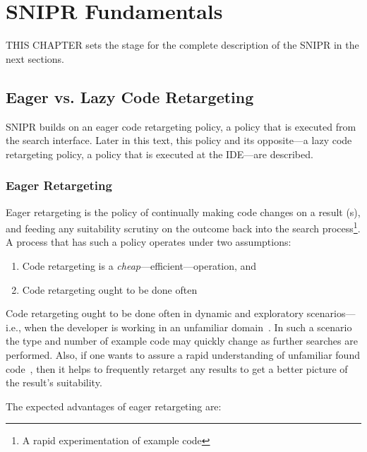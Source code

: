 \chapter{\uppercase{SnipR} Fundamentals}{}
\label{sec:fundamentals}


\lettrine[lraise=0.1, nindent=0em, slope=-.5em]{T} {HIS CHAPTER} sets the stage for the complete description of the \uppercase{SnipR} in the next sections.

\section{Eager vs. Lazy Code Retargeting}
\label{sec:eagervslazy}

\uppercase{SnipR} builds on an eager code retargeting policy, a policy that is executed from the search interface. Later in this text, this policy and its opposite---a lazy code retargeting policy, a policy that is executed at the IDE---are described.

\subsection{Eager Retargeting}

Eager retargeting is the policy of continually making code changes on a result (s), and feeding any suitability scrutiny on the outcome back into the search process\footnote{A rapid experimentation of example code}. A process that has such a policy operates under two assumptions:

\begin{enumerate}
	\item Code retargeting is a \emph{cheap}---efficient---operation, and
	\item Code retargeting ought to be done often
\end{enumerate}

Code retargeting ought to be done often in dynamic and exploratory scenarios---i.e., when the developer is working in an unfamiliar domain~\cite{Brandt:2009ew}. In such a scenario the type and number of example code may quickly change as further searches are performed. Also, if one wants to assure a rapid understanding of unfamiliar found code~\cite{Brandt:2009ew}, then it helps to frequently retarget any results to get a better picture of the result's suitability.

The expected advantages of eager retargeting are:

